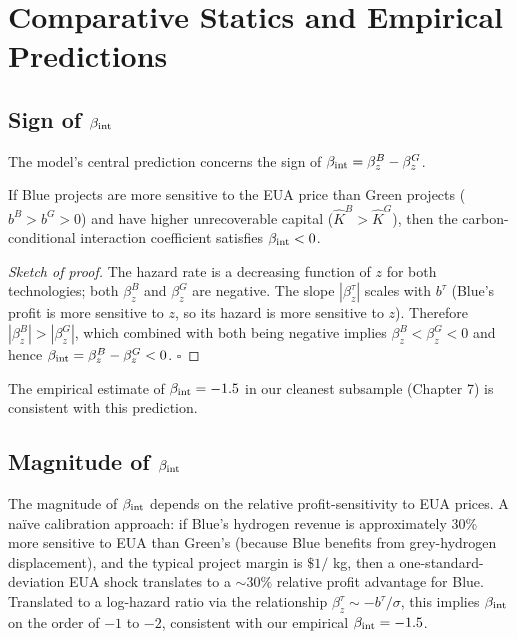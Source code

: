 \section{Comparative Statics and Empirical Predictions}
\label{sec:ch3-comparative}

\subsection{Sign of $\beta_{\mathrm{int}}$}

The model's central prediction concerns the sign of $\beta_{\mathrm{int}} = \beta_z^B - \beta_z^G$.

\begin{proposition}
\label{prop:ch3-sign}
If Blue projects are more sensitive to the EUA price than Green projects ($b^B > b^G > 0$) and have higher unrecoverable capital ($\hat{K}^B > \hat{K}^G$), then the carbon-conditional interaction coefficient satisfies $\beta_{\mathrm{int}} < 0$.
\end{proposition}

\begin{proof}[Sketch of proof]
The hazard rate is a decreasing function of $z$ for both technologies; both $\beta_z^B$ and $\beta_z^G$ are negative. The slope $|\beta_z^{\tau}|$ scales with $b^{\tau}$ (Blue's profit is more sensitive to $z$, so its hazard is more sensitive to $z$). Therefore $|\beta_z^B| > |\beta_z^G|$, which combined with both being negative implies $\beta_z^B < \beta_z^G < 0$ and hence $\beta_{\mathrm{int}} = \beta_z^B - \beta_z^G < 0$. \hfill $\square$
\end{proof}

The empirical estimate of $\beta_{\mathrm{int}} = -1.5$ in our cleanest subsample (Chapter 7) is consistent with this prediction.

\subsection{Magnitude of $\beta_{\mathrm{int}}$}

The magnitude of $\beta_{\mathrm{int}}$ depends on the relative profit-sensitivity to EUA prices. A naïve calibration approach: if Blue's hydrogen revenue is approximately $30\%$ more sensitive to EUA than Green's (because Blue benefits from grey-hydrogen displacement), and the typical project margin is $\$ 1/$ kg, then a one-standard-deviation EUA shock translates to a $\sim 30\%$ relative profit advantage for Blue. Translated to a log-hazard ratio via the relationship $\beta_z^{\tau} \sim -b^{\tau} / \sigma$, this implies $\beta_{\mathrm{int}}$ on the order of $-1$ to $-2$, consistent with our empirical $\beta_{\mathrm{int}} = -1.5$.


